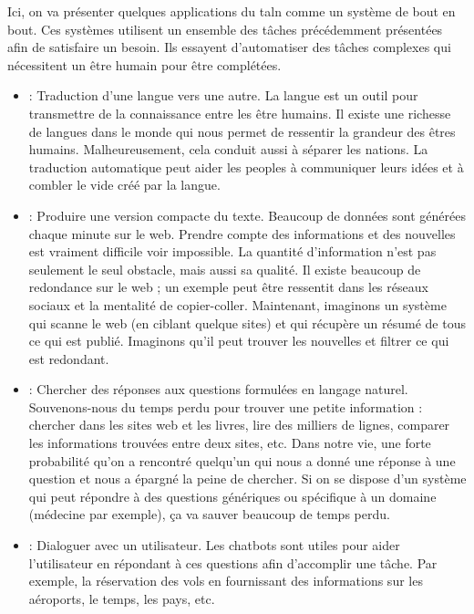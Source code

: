 \documentclass{KodeBook}
\begin{document}
Ici, on va présenter quelques applications du \ac{taln} comme un système de bout en bout. 
Ces systèmes utilisent un ensemble des tâches précédemment présentées afin de satisfaire un besoin. 
Ils essayent d'automatiser des tâches complexes qui nécessitent un être humain pour être complétées.
\begin{itemize}
	\item {} : Traduction d'une langue vers une autre.
	La langue est un outil pour transmettre de la connaissance entre les être humains. 
	Il existe une richesse de langues dans le monde qui nous permet de ressentir la grandeur des êtres humains.
	Malheureusement, cela conduit aussi à séparer les nations.
	La traduction automatique peut aider les peoples à communiquer leurs idées et à combler le vide créé par la langue. 
	\item {} : Produire une version compacte du texte.
	Beaucoup de données sont générées chaque minute sur le web. 
	Prendre compte des informations et des nouvelles est vraiment difficile voir impossible.
	La quantité d'information n'est pas seulement le seul obstacle, mais aussi sa qualité. 
	Il existe beaucoup de redondance sur le web ; un exemple peut être ressentit dans les réseaux sociaux et la mentalité de copier-coller. 
	Maintenant, imaginons un système qui scanne le web (en ciblant quelque sites) et qui récupère un résumé de tous ce qui est publié. 
	Imaginons qu'il peut trouver les nouvelles et filtrer ce qui est redondant.
	
	\item {} : Chercher des réponses aux questions formulées en langage naturel.
	Souvenons-nous du temps perdu pour trouver une petite information : chercher dans les sites web et les livres, lire des milliers de lignes, comparer les informations trouvées entre deux sites, etc.
	Dans notre vie, une forte probabilité qu'on a rencontré quelqu'un qui nous a donné une réponse à une question et nous a épargné la peine de chercher.
	Si on se dispose d'un système qui peut répondre à des questions génériques ou spécifique à un domaine (médecine par exemple), ça va sauver beaucoup de temps perdu.
	
	\item {} : Dialoguer avec un utilisateur. 
	Les chatbots sont utiles pour aider l'utilisateur en répondant à ces questions afin d'accomplir une tâche.
	Par exemple, la réservation des vols en fournissant des informations sur les aéroports, le temps, les pays, etc. 
	

\end{itemize}
\end{document}
